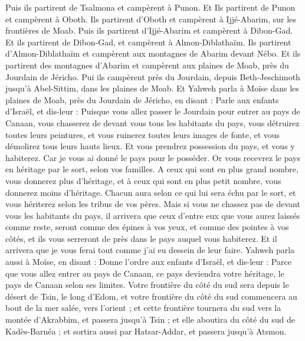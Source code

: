 \begin{multicols}{2}
Puis ils partirent de Tsalmona et campèrent à Punon.
Et Ils partirent de Punon et campèrent à Oboth.
Ils partirent d'Oboth et campèrent à Ijjé-Abarim, sur les frontières de Moab.
Puis ils partirent d'Ijjé-Abarim et campèrent à Dibon-Gad.
Et ils partirent de Dibon-Gad, et campèrent à Almon-Diblathaïm.
Ils partirent d'Almon-Diblathaïm et campèrent aux montagnes de Abarim devant Nébo.
Et ils partirent des montagnes d'Abarim et campèrent aux plaines de Moab, près du Jourdain de Jéricho.
Pui ils campèrent près du Jourdain, depuis Beth-Jeschimoth jusqu'à Abel-Sittim, dans les plaines de Moab.
Et Yahweh parla à Moïse dans les plaines de Moab, près du Jourdain de Jéricho, en disant :
Parle aux enfants d'Israël, et dis-leur : Puisque vous allez passer le Jourdain pour entrer au pays de Canaan,
vous chasserez de devant vous tous les habitants du pays, vous détruirez toutes leurs peintures, et vous ruinerez toutes leurs images de fonte, et vous démolirez tous leurs hauts lieux.
Et vous prendrez possession du pays, et vous y habiterez. Car je vous ai donné le pays pour le posséder.
Or vous recevrez le pays en héritage par le sort, selon vos familles. A ceux qui sont en plus grand nombre, vous donnerez plus d'héritage, et à ceux qui sont en plus petit nombre, vous donnerez moins d'héritage. Chacun aura selon ce qui lui sera échu par le sort, et vous hériterez selon les tribus de vos pères.
Mais si vous ne chassez pas de devant vous les habitants du pays, il arrivera que ceux d'entre eux que vous aurez laissés comme reste, seront comme des épines à vos yeux, et comme des pointes à vos côtés, et ils vous serreront de près dans le pays auquel vous habiterez.
Et il arrivera que je vous ferai tout comme j'ai eu dessein de leur faire.
\VerseOne{}Yahweh parla aussi à Moïse, en disant :
Donne l'ordre aux enfants d'Israël, et dis-leur : Parce que vous allez entrer au pays de Canaan, ce pays deviendra votre héritage, le pays de Canaan selon ses limites.
Votre frontière du côté du sud sera depuis le désert de Tsin, le long d'Edom, et votre frontière du côté du sud commencera au bout de la mer salée, vers l'orient ;
et cette frontière tournera du sud vers la montée d'Akrabbim, et passera jusqu'à Tsin ; et elle aboutira du côté du sud de Kadès-Barnéa ; et sortira aussi par Hatsar-Addar, et passera jusqu'à Atsmon.

\end{multicols}

